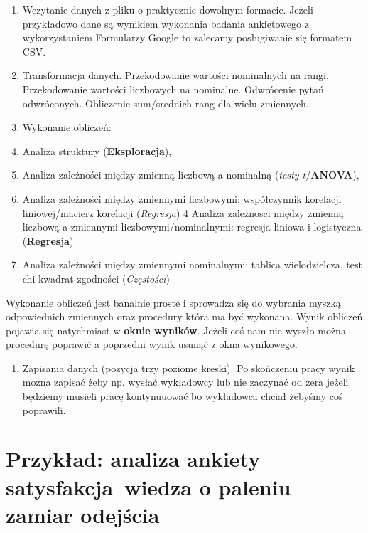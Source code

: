 \documentclass[
  openany]{book}
\providecommand{\tightlist}{%
  \setlength{\itemsep}{0pt}\setlength{\parskip}{0pt}}
\begin{document}
\begin{enumerate}
\def\labelenumi{\arabic{enumi}.}
\item
  Wczytanie danych z pliku o praktycznie dowolnym formacie. Jeżeli przykładowo
  dane są wynikiem wykonania badania ankietowego z wykorzystaniem Formularzy Google to zalecamy posługiwanie się formatem CSV.
\item
  Transformacja danych. Przekodowanie wartości nominalnych na rangi. Przekodowanie
  wartości liczbowych na nominalne.
  Odwrócenie pytań odwróconych. Obliczenie sum/srednich rang dla wielu zmiennych.
\item
  Wykonanie obliczeń:
\item
  Analiza struktury (\textbf{Eksploracja}),
\item
  Analiza zależności między zmienną liczbową a nominalną (\emph{testy t}/\textbf{ANOVA}),
\item
  Analiza zależności między zmiennymi liczbowymi: współczynnik korelacji
  liniowej/macierz korelacji (\emph{Regresja})
  4 Analiza zależnosci między zmienną liczbową a zmiennymi liczbowymi/nominalnymi:
  regresja liniowa i logistyczna (\textbf{Regresja})
\item
  Analiza zależności między zmiennymi nominalnymi: tablica wielodzielcza, test
  chi-kwadrat zgodności (\emph{Częstości})
\end{enumerate}

Wykonanie obliczeń jest banalnie proste i sprowadza się do wybrania myszką odpowiednich
zmiennych oraz procedury która ma być wykonana.
Wynik obliczeń pojawia się natychmiast w \textbf{oknie wyników}. Jeżeli coś
nam nie wyszło można procedurę poprawić a poprzedni wynik usunąć z okna wynikowego.

\begin{enumerate}
\def\labelenumi{\arabic{enumi}.}
\setcounter{enumi}{3}
\tightlist
\item
  Zapisania danych (pozycja trzy poziome kreski). Po skończeniu pracy wynik można
  zapisać żeby np. wysłać wykładowcy lub nie zaczynać od zera jeżeli będziemy musieli
  pracę kontynuuować bo wykładowca chciał żebyśmy coś poprawili.
\end{enumerate}

\hypertarget{przykux142ad-analiza-ankiety-satysfakcjawiedza-o-paleniuzamiar-odejux15bcia}{%
\section{Przykład: analiza ankiety satysfakcja--wiedza o paleniu--zamiar odejścia}\label{przykux142ad-analiza-ankiety-satysfakcjawiedza-o-paleniuzamiar-odejux15bcia}}
\end{document}
